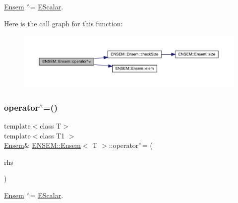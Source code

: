 \mbox{\hyperlink{classENSEM_1_1Ensem}{Ensem}} $^\wedge$= \mbox{\hyperlink{classENSEM_1_1EScalar}{E\+Scalar}}. 

Here is the call graph for this function\+:
\nopagebreak
\begin{figure}[H]
\begin{center}
\leavevmode
\includegraphics[width=350pt]{d7/d3e/classENSEM_1_1Ensem_a7f9a469a80ccb509892aef8d356fd81e_cgraph}
\end{center}
\end{figure}
\mbox{\label{classENSEM_1_1Ensem_a7f9a469a80ccb509892aef8d356fd81e}} 
\subsubsection{\texorpdfstring{operator$^\wedge$=()}{operator^=()}\hspace{0.1cm}{\footnotesize\ttfamily [3/3]}}
{\footnotesize\ttfamily template$<$class T$>$ \\
template$<$class T1 $>$ \\
\mbox{\hyperlink{classENSEM_1_1Ensem}{Ensem}}\& \mbox{\hyperlink{classENSEM_1_1Ensem}{E\+N\+S\+E\+M\+::\+Ensem}}$<$ T $>$\+::operator$^\wedge$= (\begin{DoxyParamCaption}\item[{const \mbox{\hyperlink{classENSEM_1_1EScalar}{E\+Scalar}}$<$ T1 $>$ \&}]{rhs }\end{DoxyParamCaption})\hspace{0.3cm}{\ttfamily [inline]}}



\mbox{\hyperlink{classENSEM_1_1Ensem}{Ensem}} $^\wedge$= \mbox{\hyperlink{classENSEM_1_1EScalar}{E\+Scalar}}. 

